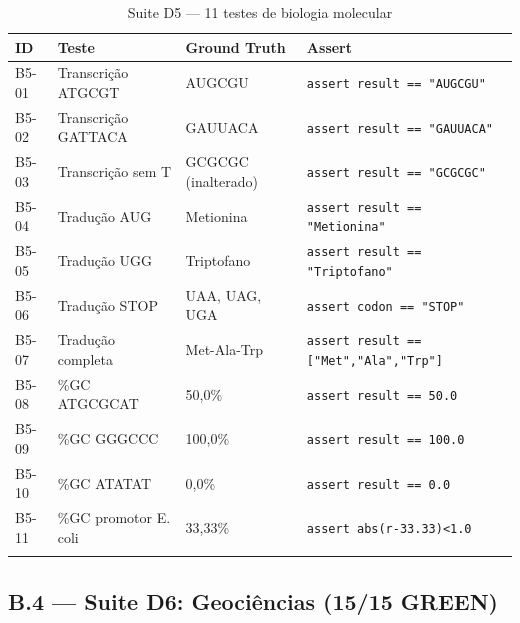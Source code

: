 \documentclass[12pt,a4paper,oneside]{article}
\begin{document}
\begin{longtable}{p{}p{}p{}p{}}
\toprule
\textbf{ID} & \textbf{Teste} & \textbf{Ground Truth} & \textbf{Assert} \\
\midrule
B5-01 & Transcrição ATGCGT & AUGCGU & \texttt{assert result == "AUGCGU"} \\
B5-02 & Transcrição GATTACA & GAUUACA & \texttt{assert result == "GAUUACA"} \\
B5-03 & Transcrição sem T & GCGCGC (inalterado) & \texttt{assert result == "GCGCGC"} \\
B5-04 & Tradução AUG & Metionina & \texttt{assert result == "Metionina"} \\
B5-05 & Tradução UGG & Triptofano & \texttt{assert result == "Triptofano"} \\
B5-06 & Tradução STOP & UAA, UAG, UGA & \texttt{assert codon == "STOP"} \\
B5-07 & Tradução completa & Met-Ala-Trp & \texttt{assert result == ["Met","Ala","Trp"]} \\
B5-08 & \%GC ATGCGCAT & 50,0\% & \texttt{assert result == 50.0} \\
B5-09 & \%GC GGGCCC & 100,0\% & \texttt{assert result == 100.0} \\
B5-10 & \%GC ATATAT & 0,0\% & \texttt{assert result == 0.0} \\
B5-11 & \%GC promotor E. coli & 33,33\% & \texttt{assert abs(r-33.33)<1.0} \\
\bottomrule
\caption{Suite D5 — 11 testes de biologia molecular}
\end{longtable}

\subsection{B.4 — Suite D6: Geociências (15/15 GREEN)}
\end{document}
